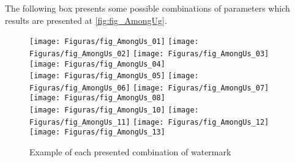 \documentclass[12pt]{article}
\begin{document}
The following box presents some possible combinations of parameters which results are presented at \autoref{fig:fig_AmongUg}.
\begin{FHZtcbAmongUs}
\usepackage{tikz-among-us-watermark-eso-pic}
\usepackage[FG]{tikz-among-us-watermark-eso-pic}
\usepackage[type=0]{tikz-among-us-watermark-eso-pic}

\usepackage[cor=blue]{tikz-among-us-watermark-eso-pic}
\usepackage[cor=green,FG]{tikz-among-us-watermark-eso-pic}

\usepackage[BG]{tikz-among-us-watermark-eso-pic}
\usepackage[cor=green!80!black,BG]{tikz-among-us-watermark-eso-pic}
\usepackage[cor=orange,type=0]{tikz-among-us-watermark-eso-pic}

\usepackage[cor=yellow!80!black,FG,type=0]{tikz-among-us-watermark-eso-pic}
\usepackage[cor=orange,BG,type=0]{tikz-among-us-watermark-eso-pic}
\usepackage[BG,type=1]{tikz-among-us-watermark-eso-pic}

\usepackage[cor=pink,type=1]{tikz-among-us-watermark-eso-pic}
\usepackage[cor=teal,FG,type=1]{tikz-among-us-watermark-eso-pic}
\usepackage[cor=brown,BG,type=1]{tikz-among-us-watermark-eso-pic}
\end{FHZtcbAmongUs}

\begin{figure}[htb] %
  \texttt{[image: Figuras/fig\_AmongUs\_01]} \hfill
  \texttt{[image: Figuras/fig\_AmongUs\_02]} \hfill
  \texttt{[image: Figuras/fig\_AmongUs\_03]} \hfill
  \texttt{[image: Figuras/fig\_AmongUs\_04]} \\
  \texttt{[image: Figuras/fig\_AmongUs\_05]} \hfill
  \texttt{[image: Figuras/fig\_AmongUs\_06]} \hfill
  \texttt{[image: Figuras/fig\_AmongUs\_07]} \hfill
  \texttt{[image: Figuras/fig\_AmongUs\_08]} \\
  \texttt{[image: Figuras/fig\_AmongUs\_10]} \hfill
  \texttt{[image: Figuras/fig\_AmongUs\_11]} \hfill
  \texttt{[image: Figuras/fig\_AmongUs\_12]} \hfill
  \texttt{[image: Figuras/fig\_AmongUs\_13]}
  \caption{Example of each presented combination of watermark}
  \label{fig:fig_AmongUg}
\end{figure}
\end{document}
